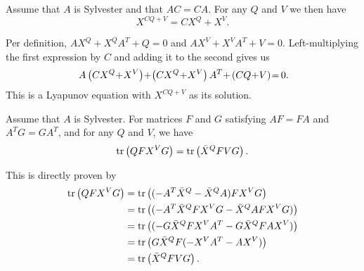 \documentclass[twocolumn]{autart}
\begin{document}
\begin{thm}\label{th:AddingLyapunovSolutions}
Assume that $A$ is Sylvester and that $AC = CA$. For any $Q$ and $V$ we then have
\begin{equation}
X^{CQ + V} = CX^Q + X^V. \label{eq:AddingLyapunovSolutions}
\end{equation}
\end{thm}
\begin{pf}
Per definition, $AX^Q + X^QA^T + Q = 0$ and $AX^V + X^VA^T + V = 0$. Left-multiplying the first expression by $C$ and adding it to the second gives us
\begin{equation}
\hspace{-0pt} A\left(CX^Q \hspace{-2pt}+\hspace{-2pt} X^V\right) \hspace{-2pt}+\hspace{-2pt} \left(CX^Q \hspace{-2pt}+\hspace{-2pt} X^V\right) A^T \hspace{-2pt}+\hspace{-1pt} \left(CQ \hspace{-2pt}+\hspace{-2pt} V\right) \hspace{-2pt}=\hspace{-1pt} 0. \hspace{-2pt}
\end{equation}
This is a Lyapunov equation with $X^{CQ+V}$ as its solution.
\end{pf}

\begin{thm}\label{th:InterchangeLyapunovSolutions}
Assume that $A$ is Sylvester. For matrices $F$ and $G$ satisfying $AF = FA$ and $A^TG = GA^T$, and for any $Q$ and $V$, we have
\begin{equation}
\mbox{tr}\left(Q F X^V G\right) = \mbox{tr}\left(\bar{X}^Q F V G\right).
\end{equation}
\end{thm}
\begin{pf}
This is directly proven by
\begin{align}
\mbox{tr}\left(Q F X^V G\right) & = \mbox{tr}\left((-A^T \bar{X}^Q - \bar{X}^Q A) F X^V G\right) \nonumber \\
& = \mbox{tr}\left((-A^T \bar{X}^Q F X^V G - \bar{X}^Q A F X^V G)\right) \nonumber \\
& = \mbox{tr}\left((-G \bar{X}^Q F X^V A^T - G \bar{X}^Q F A X^V)\right) \nonumber \\
& = \mbox{tr}\left(G \bar{X}^Q F (-X^V A^T - A X^V)\right) \nonumber \\
& = \mbox{tr}\left(\bar{X}^Q F V G\right).
\end{align}
\end{pf}
\end{document}
